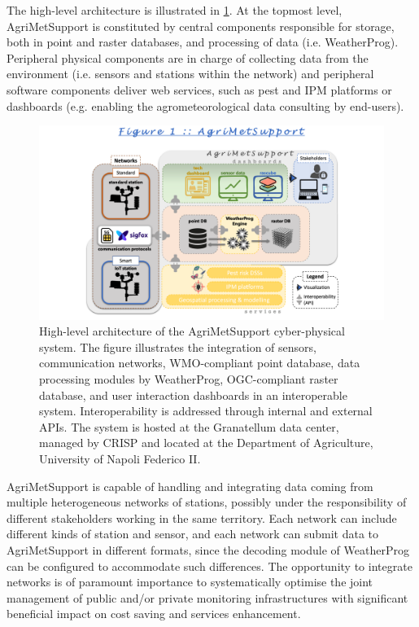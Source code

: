 \documentclass[authoryear,preprint,review,12pt]{elsarticle}
\begin{document}
The high-level architecture is illustrated in \cref{cyberPhysicalSystemFig}.
At the topmost level, Agri\-Met\-Support is constituted by central components responsible for storage, both in point and raster databases, and processing of data (i.e. WeatherProg).
Peripheral physical components are in charge of collecting data from the environment (i.e. sensors and stations within the network) and peripheral software components deliver web services, such as pest and IPM platforms or dashboards (e.g. enabling the agrometeorological data consulting by end-users).
\begin{figure}[!t] %
	\centering %
	\includegraphics[angle=0,scale=.56,trim=4.6cm 0cm 2cm 2.4cm,clip]{figures/Fig01_AgriMetSupport.png}
	\caption{
            High-level architecture of the Agri\-Met\-Support cyber-physical system. The figure illustrates the integration of sensors, communication networks, WMO-compliant point database, data processing modules by WeatherProg, OGC-compliant raster database, and user interaction dashboards in an interoperable system. Interoperability is addressed through internal and external APIs. The system is hosted at the Granatellum data center, managed by CRISP and located at the Department of Agriculture, University of Napoli Federico II.
 }
	\label{cyberPhysicalSystemFig}
\end{figure}
Agri\-Met\-Support is capable of handling and integrating data coming from multiple heterogeneous networks of stations, possibly under the responsibility of different stakeholders working in the same territory.
Each network can include different kinds of station and sensor, and each network can submit data to AgriMetSupport in different formats, since the decoding module of WeatherProg can be configured to accommodate such differences.
The opportunity to integrate networks is of paramount importance to sys\-tem\-at\-ic\-al\-ly
 optimise the joint management of public and/or private monitoring infrastructures with significant beneficial impact on cost saving and services enhancement.
\end{document}
